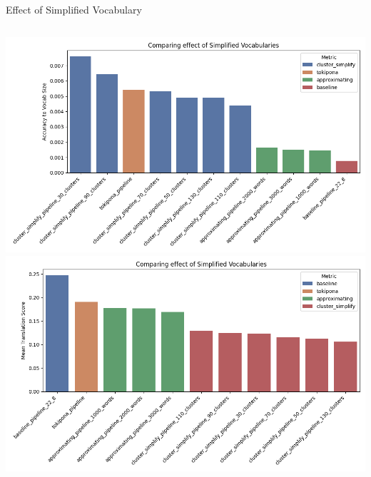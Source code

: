 \documentclass{beamer}
\begin{document}
\begin{frame}{Effect of Simplified Vocabulary}
	\begin{columns}
		\includegraphics[width=\linewidth]{figures/results/1_effect_of_vocab_simplify.png}
		\includegraphics[width=\linewidth]{figures/results/1_effect_of_vocab_simplify_mts.png}
	\end{columns}
\end{frame}
\end{document}
